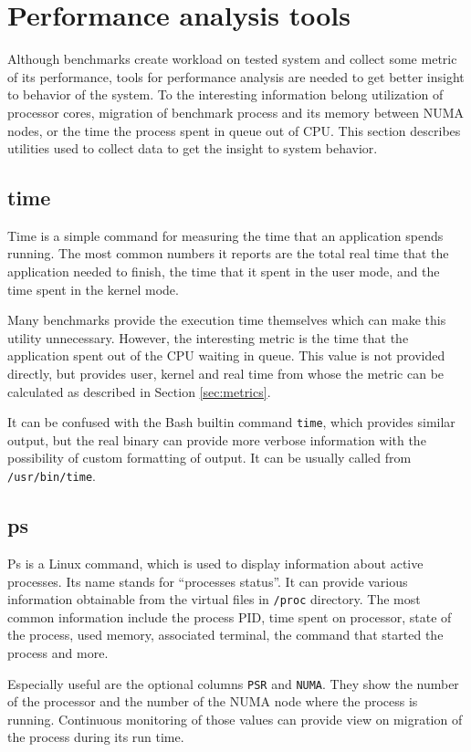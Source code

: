 \section{Performance analysis tools}
Although benchmarks create workload on tested system and collect some metric of
its performance, tools for performance analysis are needed to get better insight
to behavior of the system. To the interesting information belong utilization of
processor cores, migration of benchmark process and its memory between NUMA
nodes, or the time the process spent in queue out of CPU.
This section describes utilities used to collect data to get the insight to
system behavior.

\subsection{time}
Time is a simple command for measuring the time that an application spends
running. The most common numbers it reports are the total real time that the
application needed to finish, the time that it spent in the user mode, and the
time spent in the kernel mode.

Many benchmarks provide the execution time themselves which can make this
utility unnecessary. However, the interesting metric is the time that the
application spent out of the CPU waiting in queue. This value is not provided
directly, but provides user, kernel and real time from whose the metric can be
calculated as described in Section \ref{sec:metrics}.

It can be confused with the Bash builtin command \texttt{time}, which provides similar
output, but the real binary can provide more verbose information with
the possibility of custom formatting of output. It can be usually called from
\texttt{/usr/bin/time}.

\subsection{ps}
Ps is a Linux command, which is used to display information about active processes. Its name
stands for ``processes status''. It can provide various information obtainable from
the virtual files in \texttt{/proc} directory. The most common information
include the process PID, time spent on processor, state of the process, used memory,
associated terminal, the command that started the process and more.

Especially useful are the optional columns \texttt{PSR} and \texttt{NUMA}. They
show the number of the processor and the number of the NUMA node where the process is
running. Continuous monitoring of those values can provide view on migration of
the process during its run time. 

